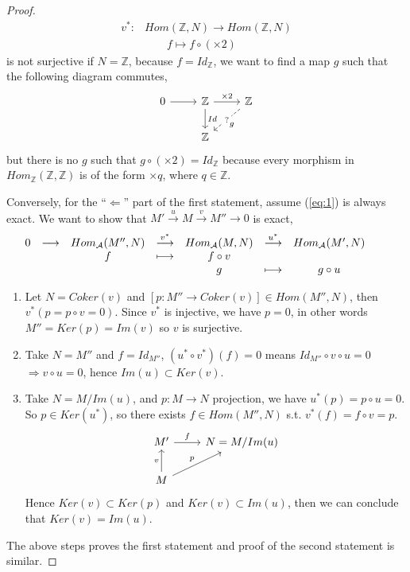 \documentclass[11pt]{article}
\newcommand{\intg}{\mathbb Z}
\newcommand{\cala}{{\cal A}}
\newcommand{\rta}{\rightarrow}
\newcommand{\Lrta}{\Longrightarrow}
\newcommand{\lrta}{\longrightarrow}
\newcommand{\Llta}{\Longleftarrow}
\begin{document}
\begin{proof}
$$
\begin{aligned}
v^*: & Hom(\intg, N)\rta Hom(\intg,N) \\
 &\ \ \ \ \ \ \ \ \ f \longmapsto  f\circ(\times 2)
\end{aligned}
$$
 is not surjective if $N=\intg$, because $f=Id_\intg$, we want to find a map $g$ such that the following diagram commutes,
 \[
\begin{tikzcd}
0 \ar[r] & \intg\ar[r,"\times 2"]\ar[d,"Id"] & \intg \ar[dl, dashed,"?"description, "g"] \\
& \intg &
\end{tikzcd}
 \]
 but there is no $g$ such that $g\circ(\times 2)=Id_\intg$ because every morphism in $Hom_\intg(\intg,\intg)$ is of the form $\times q$, where $q\in\intg$.

 Conversely, for the ``$\Llta$'' part of the first statement, assume (\ref{eq:1}) is always exact. We want to show that $M'\overset{u}{\lrta}M\overset{v}{\lrta}M'' \lrta0$ is exact, 
 $$
\begin{array}{ c c c c c c c c c}
0 & \longrightarrow  & Hom_\cala(M'',N) & \overset{v^*}{\longrightarrow } & Hom_\cala(M,N) & \overset{u^*}{\longrightarrow } & Hom_\cala(M',N) &  & \\
 &  & f &\longmapsto  & f\circ v &  &  &  & \\
 &  &  &  & g & \longmapsto & g\circ u &  &
\end{array}
 $$
 \begin{enumerate}
\item Let $N=Coker(v)$ and $[p:M''\lrta Coker(v)]\in Hom(M'',N)$, then $v^*(p=p\circ v=0)$. Since $v^*$ is injective, we have $p=0$, in other words $M''=Ker(p)=Im(v)$ so $v$ is surjective.
\item Take $N=M''$ and $f=Id_{M''}$, $(u^*\circ v^*)(f)=0$ means $Id_{M''}\circ v\circ u=0$ $\Lrta v\circ u=0$, hence $Im(u)\subset Ker(v)$.
\item  Take $N=M/Im(u)$, and $p:M\lrta N$ projection, we have $u^*(p)=p\circ u=0$. So $p\in Ker(u^*)$, so there exists $f\in Hom(M'',N) $ s.t. $v^*(f)=f\circ v=p$. 
\[
\begin{tikzcd}
 M'  \arrow[r,"f"] & N=M/Im(u) \\
M\arrow[ur,"p"] \arrow[u,"v"] &    
\end{tikzcd}
\]
Hence $Ker(v)\subset Ker(p)$ and $Ker(v)\subset Im(u)$, then we can conclude that $Ker(v)=Im(u)$.
\end{enumerate}
The above steps proves the first statement and proof of the second statement is similar.
\end{proof}
\end{document}
